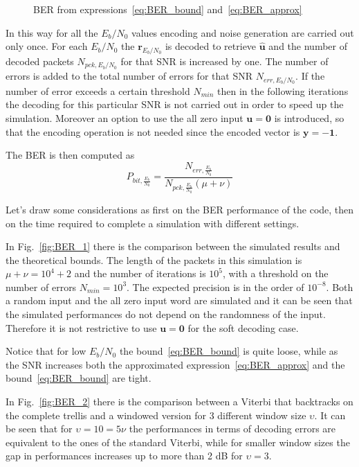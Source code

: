 \documentclass[10pt]{article}
\newlength\fheight
\newlength\fwidth
\begin{document}
\begin{figure}[t]
\centering
\setlength{}
\setlength{}

\caption{BER from expressions~\eqref{eq:BER_bound} and~\eqref{eq:BER_approx}}
\label{fig:BER_theory}
\end{figure}

In this way for all the $E_b/N_0$ values encoding and noise generation are carried out only once. For each $E_b/N_0$ the $\mathbf{r}_{E_b/N_0}$ is decoded to retrieve $\mathbf{\hat{u}}$ and the number of decoded packets $N_{pck, E_b/N_0}$ for that SNR is increased by one. The number of errors is added to the total number of errors for that SNR $N_{err, E_b/N_0}$. If the number of error exceeds a certain threshold $N_{min}$ then in the following iterations the decoding for this particular SNR is not carried out in order to speed up the simulation. Moreover an option to use the all zero input $\mathbf{u} = \mathbf{0}$ is introduced, so that the encoding operation is not needed since the encoded vector is $\mathbf{y} = -\mathbf{1}$. 

The BER is then computed as
\begin{equation}
	P_{bit, \frac{E_b}{N_0}} =\frac{N_{err, \frac{E_b}{N_0}}}{N_{pck, \frac{E_b}{N_0}}(\mu+\nu)}
\end{equation}

Let's draw some considerations as first on the BER performance of the code, then on the time required to complete a simulation with different settings.

In Fig.~\ref{fig:BER_1} there is the comparison between the simulated results and the theoretical bounds. The length of the packets in this simulation is $\mu + \nu = 10^4 + 2$ and the number of iterations is $10^5$, with a threshold on the number of errors $N_{min} = 10^3$. The expected precision is in the order of $10^{-8}$. Both a random input and the all zero input word are simulated and it can be seen that the simulated performances do not depend on the randomness of the input. Therefore it is not restrictive to use $\mathbf{u} = \mathbf{0}$ for the soft decoding case.

Notice that for low $E_b/N_0$ the bound~\eqref{eq:BER_bound} is quite loose, while as the SNR increases both the approximated expression~\eqref{eq:BER_approx} and the bound~\eqref{eq:BER_bound} are tight. 

In Fig.~\ref{fig:BER_2} there is the comparison between a Viterbi that backtracks on the complete trellis and a windowed version for 3 different window size $\upsilon$. It can be seen that for $\upsilon = 10 = 5\nu$ the performances in terms of decoding errors are equivalent to the ones of the standard Viterbi, while for smaller window sizes the gap in performances increases up to more than 2 dB for $\upsilon = 3$. 
\end{document}
